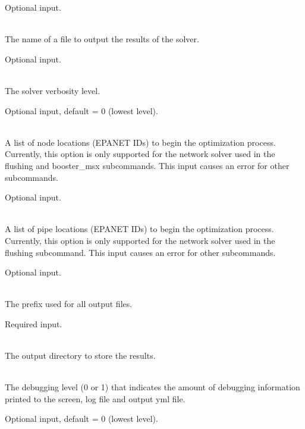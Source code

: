 \begin{description}[topsep=0pt,parsep=0.5em,itemsep=-0.4em]
\begin{description}[topsep=0pt,parsep=0.5em,itemsep=-0.4em]
                Optional input.
    \item[{logfile}]\hfill
\\The name of a file to output the results of the solver.
                
                Optional input.
    \item[{verbose}]\hfill
\\The solver verbosity level.
                
                Optional input, default = 0 (lowest level).
    \item[{initial points}]\hfill
    \begin{description}[topsep=0pt,parsep=0.5em,itemsep=-0.4em]
      \item[{nodes}]\hfill
\\A list of node locations (EPANET IDs) to begin the optimization
        process. Currently, this option is only supported for the
        network solver used in the flushing and booster\_msx
        subcommands. This input causes an error for other subcommands.
        
        Optional input.
      \item[{pipes}]\hfill
\\A list of pipe locations (EPANET IDs) to begin the optimization
        process. Currently, this option is only supported for the
        network solver used in the flushing subcommand. This input causes an error for other subcommands.
        
        Optional input.
    \end{description}
  \end{description}
  \item[{configure}]\hfill
  \begin{description}[topsep=0pt,parsep=0.5em,itemsep=-0.4em]
    \item[{output prefix}]\hfill
\\The prefix used for all output files.
                
                Required input.
    \item[{output directory}]\hfill
      \\The output directory to store the results.
    \item[{debug}]\hfill
\\The debugging level (0 or 1) that indicates the amount of debugging 
                information printed to the screen, log file and output yml file. 
                
                Optional input, default = 0 (lowest level).
  \end{description}
\end{description}
